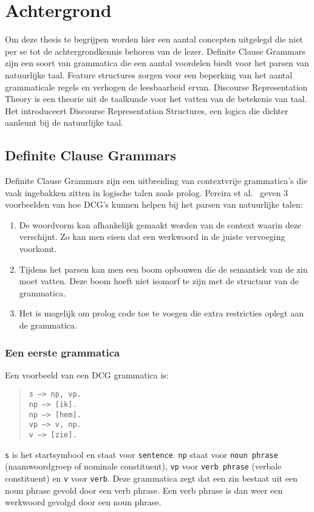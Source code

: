 \chapter{Achtergrond}
Om deze thesis te begrijpen worden hier een aantal concepten uitgelegd die niet per se tot de achtergrondkennis behoren van de lezer. Definite Clause Grammars zijn een soort van grammatica die een aantal voordelen biedt voor het parsen van natuurlijke taal. Feature structures zorgen voor een beperking van het aantal grammaticale regels en verhogen de leesbaarheid ervan. Discourse Representation Theory is een theorie uit de taalkunde voor het vatten van de betekenis van taal. Het introduceert Discourse Representation Structures, een logica die dichter aanleunt bij de natuurlijke taal.

\section{Definite Clause Grammars}
\label{sec:DCG}
Definite Clause Grammars \cite{Pereira1980} zijn een uitbreiding van contextvrije grammatica's die vaak ingebakken zitten in logische talen zoals prolog. Pereira et al.\ \cite{Pereira1980} geven 3 voorbeelden van hoe DCG's kunnen helpen bij het parsen van natuurlijke talen:

\begin{enumerate}
  \item De woordvorm kan afhankelijk gemaakt worden van de context waarin deze verschijnt. Zo kan men eisen dat een werkwoord in de juiste vervoeging voorkomt.
  \item Tijdens het parsen kan men een boom opbouwen die de semantiek van de zin moet vatten. Deze boom hoeft niet isomorf te zijn met de structuur van de grammatica.
  \item Het is mogelijk om prolog code toe te voegen die extra restricties oplegt aan de grammatica.
\end{enumerate}

\subsection{Een eerste grammatica}
\begin{ex}
  Een voorbeeld van een DCG grammatica is:
  \begin{quote}
    \texttt{s ---> np, vp.} \\
    \texttt{np ---> [ik].} \\
    \texttt{np ---> [hem].} \\
    \texttt{vp ---> v, np.} \\
    \texttt{v ---> [zie].}
  \end{quote}
\end{ex} 
\texttt{s} is het startsymbool en staat voor \texttt{sentence}. \texttt{np} staat voor \texttt{noun phrase} (naamwoordgroep of nominale constituent), \texttt{vp} voor \texttt{verb phrase} (verbale constituent) en \texttt{v} voor \texttt{verb}. Deze grammatica zegt dat een zin bestaat uit een noun phrase gevold door een verb phrase. Een verb phrase is dan weer een werkwoord gevolgd door een noun phrase.

